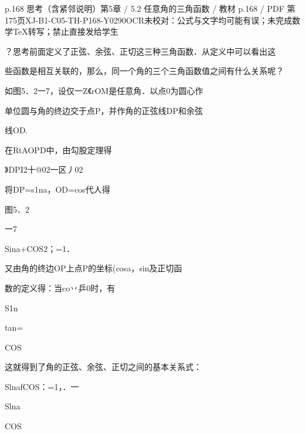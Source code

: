 \begin{bankitem}{p.168 思考（含紧邻说明）}{第5章 / 5.2 任意角的三角函数 / 教材 p.168 / PDF 第175页}{XJ-B1-C05-TH-P168-Y0290}{OCR未校对：公式与文字均可能有误；未完成数学TeX转写；禁止直接发给学生}
\begin{ocrdraft}
\par
？思考前面定义了正弦、余弦、正切这三种三角函数．从定义中可以看出这
\par
些函数是相互关联的，那么，同一个角的三个三角函数值之间有什么关系呢？
\par
如图5．2一7，设仅一Z《rOM是任意角．以点0为圆心作
\par
单位圆与角的终边交于点P，并作角的正弦线DP和余弦
\par
线OD.
\par
在RtAOPD中，由勾股定理得
\par
》DPI2十@02一区丿02
\par
将DP=s1na，OD=cos代人得
\par
图5．2
\par
一7
\par
Sina+COS2；=1．
\par
又由角的终边OP上点P的坐标(cosa，sin及正切函
\par
数的定义得：当co丷乒0时，有
\par
S1n
\par
tan=
\par
COS
\par
这就得到了角的正弦、余弦、正切之间的基本关系式：
\par
SlnafCOS：=1，．一
\par
Slna
\par
COS
\end{ocrdraft}
\end{bankitem}
